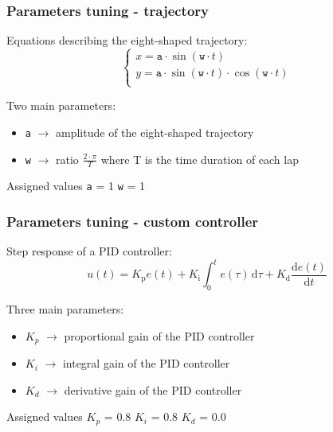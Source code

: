 \documentclass{beamer}
\begin{document}
\begin{frame}
\frametitle{Parameters tuning - trajectory}

Equations describing the eight-shaped trajectory:
$$
\begin{cases}
    x = \texttt{a} \cdot \sin (\texttt{w} \cdot t)\\
    y = \texttt{a} \cdot \sin (\texttt{w} \cdot t)\cdot \cos (\texttt{w} \cdot t)\\
\end{cases}
$$

\vspace{1em}

Two main parameters:
\begin{itemize}
 \item \texttt{a} $\rightarrow$ amplitude of the eight-shaped trajectory
 \item \texttt{w} $\rightarrow$ ratio $\frac{2 \cdot \pi}{T}$ where T is the time duration of each lap
\end{itemize}

\vspace{1em}

\begin{block}{Assigned values}
\centering
\texttt{a} = 1
\hspace{3em}
\texttt{w} = 1
\end{block}

\end{frame}


\begin{frame}
\frametitle{Parameters tuning - custom controller}

Step response of a PID controller:
$$
u(t)=K_{\text{p}}e(t)+K_{\text{i}}\int _{0}^{t}e(\tau )\,\mathrm {d} \tau +K_{\text{d}}{\frac {\mathrm {d} e(t)}{\mathrm {d} t}}
$$

\vspace{1em}

Three main parameters:
\begin{itemize}
 \item $K_p$ $\rightarrow$ proportional gain of the PID controller
 \item $K_i$ $\rightarrow$ integral gain of the PID controller
 \item $K_d$ $\rightarrow$ derivative gain of the PID controller
\end{itemize}

\vspace{1em}

\begin{block}{Assigned values}
\centering
$K_p$ = 0.8
\hspace{3em}
$K_i$ = 0.8
\hspace{3em}
$K_d$ = 0.0
\end{block}

\end{frame}
\end{document}
